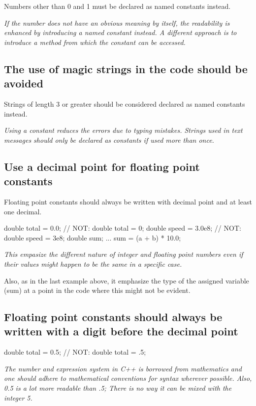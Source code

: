 \documentclass[a4paper,11pt,oneside]{scrbook}
\newcommand{\guideline}[1]{{\subsection{#1}}}
\newcommand{\motivation}[1]{{\normalfont \itshape #1}}
\begin{document}
Numbers other than 0 and 1 must be declared as named constants instead.

\motivation{
  If the number does not have an obvious meaning by itself, the
  readability is enhanced by introducing a named constant instead. A
  different approach is to introduce a method from which the constant
  can be accessed.
}

\guideline{The use of magic strings in the code should be avoided}

Strings of length 3 or greater should be considered declared as named
constants instead.

\motivation{
  Using a constant reduces the errors due to typing mistakes. Strings used in
  text messages should only be declared as constants if used more than once.
}

\guideline{Use a decimal point for floating point constants}

Floating point constants should always be written with decimal point
and at least one decimal.

\begin{code}
  double total = 0.0;     // NOT: double total = 0; 
  double speed = 3.0e8;   // NOT: double speed = 3e8;
  double sum;
  ...
  sum = (a + b) * 10.0; 
\end{code}

\motivation{
  This empasize the different nature of integer and floating point
  numbers even if their values might happen to be the same in a specific
  case.
}

Also, as in the last example above, it emphasize the type of the
assigned variable (sum) at a point in the code where this might not be
evident.

\guideline{Floating point constants should always be written with a digit before the decimal point}

\begin{code}
  double total = 0.5;             // NOT: double total = .5; 
\end{code}

\motivation{
  The number and expression system in C++ is borrowed from mathematics
  and one should adhere to mathematical conventions for syntax wherever
  possible. Also, 0.5 is a lot more readable than .5; There is no way it
  can be mixed with the integer 5.
}
\end{document}

